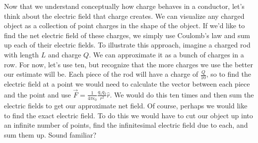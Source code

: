 \documentclass[nobib]{tufte-handout}
\begin{document}
Now that we understand conceptually how charge behaves in a conductor, 
let's think about the electric field that charge creates. We can
visualize any charged object as a collection of point charges in the shape of 
the object. If we'd like to find the net electric field of these charges, 
we simply use Coulomb's law and sum up each of their electric fields. To 
illustrate this approach, imagine a charged rod with length $L$ and charge $Q$. We can 
approximate it as a bunch of charges in a row. For now, let's use ten, but
recognize that the more charges we use the better our estimate will be. 
Each piece of the rod will have a charge of $\frac{Q}{10}$, so to find 
the electric field at a point we would need to calculate the vector between each piece 
and the point and use $\vec{F} = \frac{1}{4\pi \epsilon_0}\frac{q_1 q_2}{r^2}\hat{r}$. 
We would do this ten times and then sum the electric fields to get our approximate net field. 
Of course, perhaps we would like to find the exact electric field. To do this
we would have to cut our object up into an infinite number of points, find the 
infinitesimal electric field due to each, and sum them up. Sound familiar? 
\end{document}
